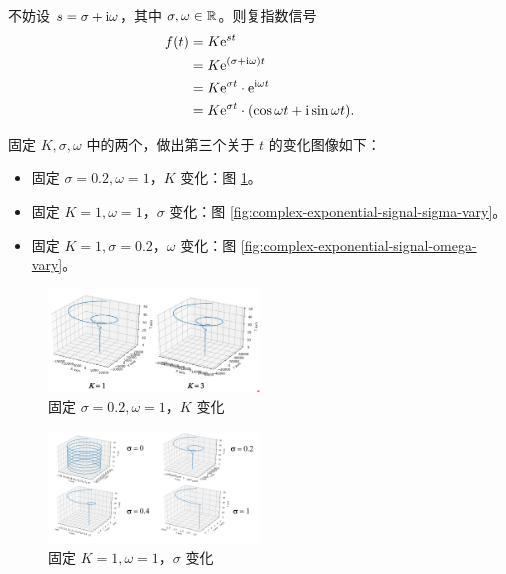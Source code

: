 \begin{property}[复指数信号与正余弦信号之间的关系]
    不妨设 $s = \sigma + \mathrm{i}\omega$，其中 $\sigma, \omega \in \mathbb{R}$。则复指数信号
    \begin{align*}
        f(t) & = K\mathrm{e}^{st} \\
        & = K\mathrm{e}^{(\sigma + \mathrm{i}\omega)t} \\
        & = K\mathrm{e}^{\sigma t} \cdot \mathrm{e}^{\mathrm{i} \omega t} \\
        & = K\mathrm{e}^{\sigma t} \cdot (\cos \omega t + \mathrm{i} \sin \omega t).
    \end{align*}

    固定 $K, \sigma, \omega$ 中的两个，做出第三个关于 $t$ 的变化图像如下：
    \begin{itemize}
        \item 固定 $\sigma = 0.2, \omega = 1$，$K$ 变化：图 \ref{fig:complex-exponential-signal-k-vary}。
        \item 固定 $K = 1, \omega = 1$，$\sigma$ 变化：图 \ref{fig:complex-exponential-signal-sigma-vary}。
        \item 固定 $K = 1, \sigma = 0.2$，$\omega$ 变化：图 \ref{fig:complex-exponential-signal-omega-vary}。
    \end{itemize}
    \begin{figure}[htbp]
        \centering
        \includegraphics[width=0.5\textwidth]{chap1/img/complex-exponential-signal-k-vary.png}
        \caption{固定 $\sigma = 0.2, \omega = 1$，$K$ 变化}
        \label{fig:complex-exponential-signal-k-vary}
    \end{figure}
    \begin{figure}[htbp]
        \centering
        \includegraphics[width=0.5\textwidth]{chap1/img/complex-exponential-signal-sigma-vary.png}
        \caption{固定 $K = 1, \omega = 1$，$\sigma$ 变化}

\end{figure}
\end{property}
